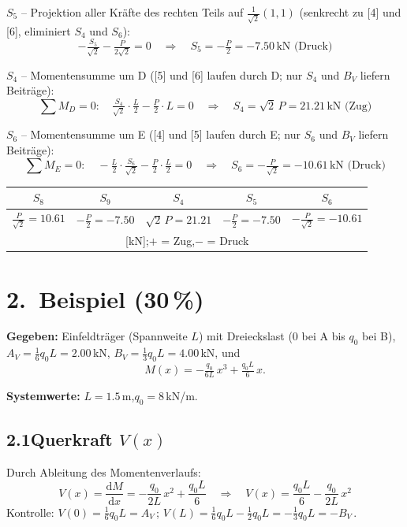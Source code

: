\documentclass[a4paper,11pt]{article}
\begin{document}
\textbf{$S_5$} -- Projektion aller Kräfte des rechten Teils auf $\tfrac{1}{\sqrt{2}}(1,1)$
(senkrecht zu [4] und [6], eliminiert $S_4$ und $S_6$):
\[
  -\tfrac{S_5}{\sqrt{2}} - \tfrac{P}{2\sqrt{2}} = 0
  \quad\Rightarrow\quad \boxed{S_5 = -\tfrac{P}{2} = -7.50\,\text{kN (Druck)}}
\]

\textbf{$S_4$} -- Momentensumme um D
([5] und [6] laufen durch D; nur $S_4$ und $B_V$ liefern Beiträge):
\[
  \sum M_D = 0:\quad \tfrac{S_4}{\sqrt{2}}\cdot\tfrac{L}{2} - \tfrac{P}{2}\cdot L = 0
  \quad\Rightarrow\quad \boxed{S_4 = \sqrt{2}\,P = 21.21\,\text{kN (Zug)}}
\]

\textbf{$S_6$} -- Momentensumme um E
([4] und [5] laufen durch E; nur $S_6$ und $B_V$ liefern Beiträge):
\[
  \sum M_E = 0:\quad -\tfrac{L}{2}\cdot\tfrac{S_6}{\sqrt{2}} - \tfrac{P}{2}\cdot\tfrac{L}{2} = 0
  \quad\Rightarrow\quad \boxed{S_6 = -\tfrac{P}{\sqrt{2}} = -10.61\,\text{kN (Druck)}}
\]

\medskip
\begin{center}
\begin{tabular}{ccccc}
\toprule
$S_8$ & $S_9$ & $S_4$ & $S_5$ & $S_6$ \\
\midrule
$\tfrac{P}{\sqrt{2}} = 10.61$ & $-\tfrac{P}{2} = -7.50$ &
$\sqrt{2}\,P = 21.21$ & $-\tfrac{P}{2} = -7.50$ & $-\tfrac{P}{\sqrt{2}} = -10.61$ \\
\multicolumn{5}{c}{\small [kN];\quad $+$ = Zug,\quad $-$ = Druck} \\
\bottomrule
\end{tabular}
\end{center}

\newpage
\section*{2.~Beispiel \hfill (30\,\%)}

\textbf{Gegeben:} Einfeldträger (Spannweite $L$) mit Dreieckslast
(0 bei A bis $q_0$ bei B),
$A_V = \tfrac{1}{6}q_0 L = 2.00$\,kN,
$B_V = \tfrac{1}{3}q_0 L = 4.00$\,kN, und
\[
  M(x) = -\tfrac{q_0}{6L}\,x^3 + \tfrac{q_0 L}{6}\,x.
\]

\textbf{Systemwerte:} $L = 1.5$\,m,\quad $q_0 = 8$\,kN/m.

\subsection*{2.1\quad Querkraft $V(x)$}

Durch Ableitung des Momentenverlaufs:
\[
  V(x) = \frac{\mathrm{d}M}{\mathrm{d}x}
        = -\frac{q_0}{2L}\,x^2 + \frac{q_0 L}{6}
  \quad\Rightarrow\quad
  \boxed{V(x) = \frac{q_0 L}{6} - \frac{q_0}{2L}\,x^2}
\]
Kontrolle: $V(0) = \tfrac{1}{6}q_0 L = A_V$\,\checkmark;\quad
$V(L) = \tfrac{1}{6}q_0 L - \tfrac{1}{2}q_0 L = -\tfrac{1}{3}q_0 L = -B_V$\,\checkmark.
\end{document}
